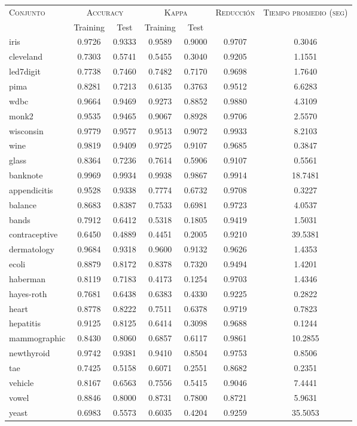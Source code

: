 \begin{table}[]
\centering
\begin{tabular}{l c c c c c c}
\hline
\multirow{2}{*}{\textsc{Conjunto}}
	& \multicolumn{2}{c}{\textsc{Accuracy}}
	& \multicolumn{2}{c}{\textsc{Kappa}}
	& \textsc{Reducción}
	& \textsc{Tiempo promedio (seg)} \\
	& Training & Test
	& Training & Test \\ 
\hline
\hline

iris & 0.9726 & 0.9333 & 0.9589 & 0.9000 & 0.9707 & 0.3046 \\
cleveland & 0.7303 & 0.5741 & 0.5455 & 0.3040 & 0.9205 & 1.1551 \\
led7digit & 0.7738 & 0.7460 & 0.7482 & 0.7170 & 0.9698 & 1.7640 \\
pima & 0.8281 & 0.7213 & 0.6135 & 0.3763 & 0.9512 & 6.6283 \\
wdbc & 0.9664 & 0.9469 & 0.9273 & 0.8852 & 0.9880 & 4.3109 \\
monk2 & 0.9535 & 0.9465 & 0.9067 & 0.8928 & 0.9706 & 2.5570 \\
wisconsin & 0.9779 & 0.9577 & 0.9513 & 0.9072 & 0.9933 & 8.2103 \\
wine & 0.9819 & 0.9409 & 0.9725 & 0.9107 & 0.9685 & 0.3847 \\
glass & 0.8364 & 0.7236 & 0.7614 & 0.5906 & 0.9107 & 0.5561 \\
banknote & 0.9969 & 0.9934 & 0.9938 & 0.9867 & 0.9914 & 18.7481 \\
appendicitis & 0.9528 & 0.9338 & 0.7774 & 0.6732 & 0.9708 & 0.3227 \\
balance & 0.8683 & 0.8387 & 0.7533 & 0.6981 & 0.9723 & 4.0537 \\
bands & 0.7912 & 0.6412 & 0.5318 & 0.1805 & 0.9419 & 1.5031 \\
contraceptive & 0.6450 & 0.4889 & 0.4451 & 0.2005 & 0.9210 & 39.5381 \\
dermatology & 0.9684 & 0.9318 & 0.9600 & 0.9132 & 0.9626 & 1.4353 \\
ecoli & 0.8879 & 0.8172 & 0.8378 & 0.7320 & 0.9494 & 1.4201 \\
haberman & 0.8119 & 0.7183 & 0.4173 & 0.1254 & 0.9703 & 1.4346 \\
hayes-roth & 0.7681 & 0.6438 & 0.6383 & 0.4330 & 0.9225 & 0.2822 \\
heart & 0.8778 & 0.8222 & 0.7511 & 0.6378 & 0.9719 & 0.7823 \\
hepatitis & 0.9125 & 0.8125 & 0.6414 & 0.3098 & 0.9688 & 0.1244 \\
mammographic & 0.8430 & 0.8060 & 0.6857 & 0.6117 & 0.9861 & 10.2855 \\
newthyroid & 0.9742 & 0.9381 & 0.9410 & 0.8504 & 0.9753 & 0.8506 \\
tae & 0.7425 & 0.5158 & 0.6071 & 0.2551 & 0.8682 & 0.2351 \\
vehicle & 0.8167 & 0.6563 & 0.7556 & 0.5415 & 0.9046 & 7.4441 \\
vowel & 0.8846 & 0.8000 & 0.8731 & 0.7800 & 0.8721 & 5.9631 \\
yeast & 0.6983 & 0.5573 & 0.6035 & 0.4204 & 0.9259 & 35.5053 \\


\end{tabular}
\end{table}
